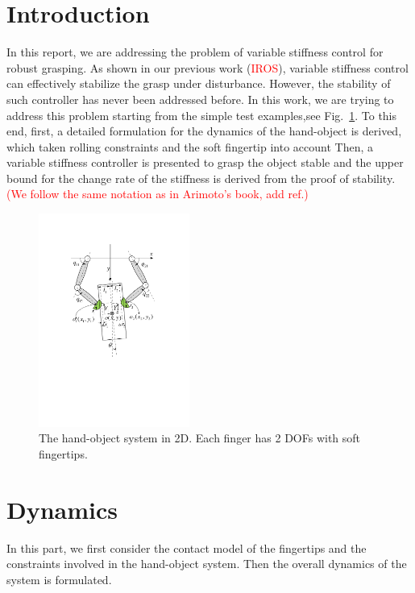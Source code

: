 \documentclass[]{article}
\title{}
\author{Miao Li}
\begin{document}
\maketitle

\begin{abstract}
\end{abstract}

\section{Introduction}
In this report, we are addressing the problem of variable stiffness control for robust grasping. As shown in our previous work (\textcolor{red}{IROS}), variable stiffness control can effectively stabilize the grasp under disturbance. However, the stability of such controller has never been addressed before. In this work, we are trying to address this problem starting from the simple test examples,see Fig.~\ref{fig::system}.
To this end, first, a detailed formulation for the dynamics of the hand-object is derived, which taken rolling constraints and the soft fingertip into account Then, a variable stiffness controller is presented to grasp the object stable and the upper bound for the change rate of the stiffness is derived from the proof of stability.
\textcolor{red}{(We follow the same notation as in Arimoto's book, add ref.)}
\begin{figure}[h!]
\centering
\includegraphics[height=7cm]{hand_object_system.pdf}
\caption{The hand-object system in 2D. Each finger has 2 DOFs with soft fingertips.}
\label{fig::system}
\end{figure}

\section{Dynamics}
In this part, we first consider the contact model of the fingertips and the constraints involved in the hand-object system. Then the overall dynamics of the system is formulated. 
\end{document}
